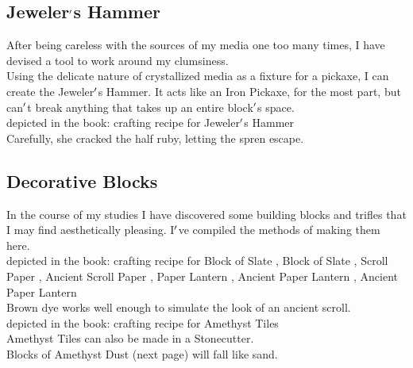 \documentclass[12pt]{article}
\begin{document}
\newpage

\label{sec:items/jeweler_hammer}
\subsection*{Jeweler$\rq$s Hammer}


  
    After being careless with the sources of my media one too many times, I have devised a tool to work around my clumsiness.\\Using the delicate nature of crystallized media as a fixture for a pickaxe, I can create the Jeweler$\rq$s Hammer. It acts like an Iron Pickaxe, for the most part, but can$\rq$t break anything that takes up an entire block$\rq$s space.\\


  
  depicted in the book: crafting recipe for 
    Jeweler$\rq$s Hammer
\\

      Carefully, she cracked the half ruby, letting the spren escape.\\


\newpage

\label{sec:items/decoration}
\subsection*{Decorative Blocks}


  
    In the course of my studies I have discovered some building blocks and trifles that I may find aesthetically pleasing. I$\rq$ve compiled the methods of making them here.\\


  
  depicted in the book: crafting recipe for 
    Block of Slate
,     Block of Slate
,     Scroll Paper
,     Ancient Scroll Paper
,     Paper Lantern
,     Ancient Paper Lantern
,     Ancient Paper Lantern
\\

      Brown dye works well enough to simulate the look of an ancient scroll.\\



  
  depicted in the book: crafting recipe for 
    Amethyst Tiles
\\

      Amethyst Tiles can also be made in a Stonecutter.\\Blocks of Amethyst Dust (next page) will fall like sand.\\
\end{document}
